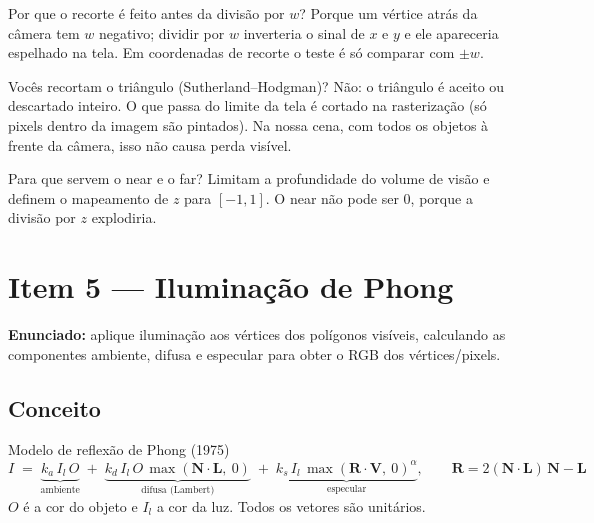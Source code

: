 \documentclass[11pt,a4paper]{article}
\newcommand{\novasecao}{\clearpage}
\newcommand{\vetor}[1]{\mathbf{#1}}
\begin{document}
\begin{pergunta}{Por que o recorte é feito antes da divisão por $w$?}
Porque um vértice atrás da câmera tem $w$ negativo; dividir por $w$ inverteria o sinal de $x$ e $y$ e
ele apareceria espelhado na tela. Em coordenadas de recorte o teste é só comparar com $\pm w$.
\end{pergunta}

\begin{pergunta}{Vocês recortam o triângulo (Sutherland--Hodgman)?}
Não: o triângulo é aceito ou descartado inteiro. O que passa do limite da tela é cortado na
rasterização (só pixels dentro da imagem são pintados). Na nossa cena, com todos os objetos à frente da
câmera, isso não causa perda visível.
\end{pergunta}

\begin{pergunta}{Para que servem o near e o far?}
Limitam a profundidade do volume de visão e definem o mapeamento de $z$ para $[-1,1]$. O near não pode
ser 0, porque a divisão por $z$ explodiria.
\end{pergunta}

\novasecao
\section{Item 5 — Iluminação de Phong}

\begin{enunciado}
\textbf{Enunciado:} aplique iluminação aos vértices dos polígonos visíveis, calculando as componentes
ambiente, difusa e especular para obter o RGB dos vértices/pixels.
\end{enunciado}

\subsection{Conceito}

\begin{conceito}{Modelo de reflexão de Phong (1975)}
\[
I \;=\; \underbrace{k_a\, I_l\, O}_{\text{ambiente}}
\;+\; \underbrace{k_d\, I_l\, O\, \max(\vetor N\cdot\vetor L,\ 0)}_{\text{difusa (Lambert)}}
\;+\; \underbrace{k_s\, I_l\, \max(\vetor R\cdot\vetor V,\ 0)^{\alpha}}_{\text{especular}},
\qquad
\vetor R = 2(\vetor N\cdot\vetor L)\,\vetor N - \vetor L
\]
$O$ é a cor do objeto e $I_l$ a cor da luz. Todos os vetores são unitários.
\end{conceito}
\end{document}
